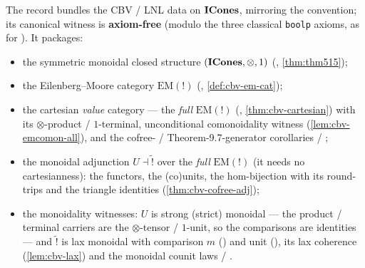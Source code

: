 \begin{theorem}\label{thm:cbv-model}
\rocqok
{}\rocqok
{}
The record  bundles the CBV /
LNL data on $\mathbf{ICones}$, mirroring the
 convention; its canonical witness
 is \textbf{axiom-free}
(modulo the three classical \texttt{boolp} axioms, as for
). It packages:
\begin{itemize}
  \item the symmetric monoidal closed structure
    $(\mathbf{ICones}, \otimes, 1)$ (,
    \autoref{thm:thm515});
  \item the Eilenberg--Moore category $\mathrm{EM}(\mathord{!})$
    (, \autoref{def:cbv-em-cat});
  \item the cartesian \emph{value} category --- the \emph{full}
    $\mathrm{EM}(\mathord{!})$ (,
    \autoref{thm:cbv-cartesian}) with its $\otimes$-product / $1$-terminal,
    unconditional comonoidality witness
    (\autoref{lem:cbv-emcomon-all}), and the cofree- /
    Theorem-9.7-generator corollaries
     /
    ;
  \item the monoidal adjunction $U \dashv \widetilde{\mathord{!}}$
    over the \emph{full} $\mathrm{EM}(\mathord{!})$ (it needs no
    cartesianness): the functors, the (co)units, the hom-bijection with
    its round-trips and the triangle identities (\autoref{thm:cbv-cofree-adj});
  \item the monoidality witnesses: $U$ is strong (strict) monoidal --- the
    product / terminal carriers are the $\otimes$-tensor / $1$-unit, so the
    comparisons are identities --- and $\widetilde{\mathord{!}}$ is
    lax monoidal with comparison $m$
    () and unit
    (), its lax coherence
    (\autoref{lem:cbv-lax}) and the monoidal counit laws
     /
    .
\end{itemize}
\end{theorem}

